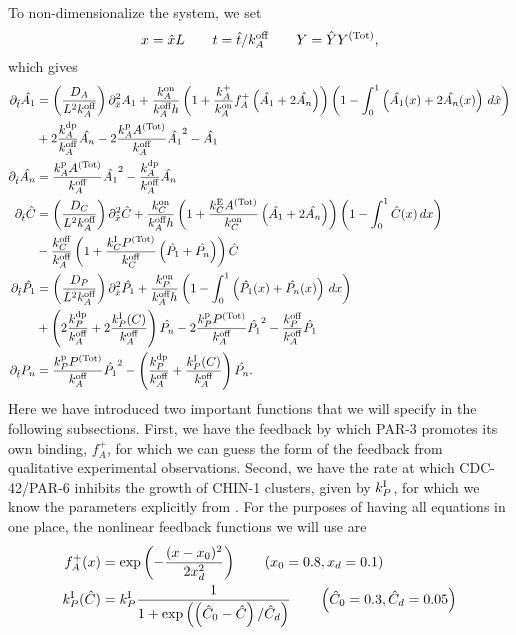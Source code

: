 \documentclass[11pt]{article}
\newcommand{\6}[1]{#1_{\text{6}}}
\newcommand{\3}[1]{#1_{\text{3}}}
\newcommand{\Tot}[1]{#1^\text{(Tot)}}
\newcommand{\A}[1]{#1_A}
\newcommand{\Chin}[1]{#1_P}
\newcommand{\C}[1]{#1_C}
\begin{document}
To non-dimensionalize the system, we set
\begin{equation*}
x = \hat{x} L \qquad t= \hat{t}/\A{\koff} \qquad Y= \hat{Y}\Tot{Y},
\end{equation*}
which gives
\begin{subequations}
\begin{align}
\nonumber
\Dthat \hat{\MA} & = \left(\frac{\A{D}}{L^2 \A{\koff}}\right) \Dxhat^2 \MA + \frac{\A{\kon}}{\A{\koff} h }\left(1+\frac{\A{\kf}}{\A{\kon}}\A{f}^+\left(\hat{\MA}+2\hat{\PA}\right)\right)\left(1 - \int_0^1 \left(\hat{\MA}(x) + 2\hat{\PA}(x)\right) \, d\hat{x} \right) \\  &+ 2\frac{\A{\kdp}}{\A{\koff}}\hat{\PA}-2\frac{\A{\kp} \Tot{A}}{\A{\koff}} \hat{\MA}^2 - \hat{\MA} \\
\Dthat \hat{\PA} & =\frac{\A{\kp} \Tot{A}}{\A{\koff}}\hat{\MA}^2- \frac{\A{\kdp}}{\A{\koff}}\hat{\PA} \\
\Dthat \hat{\CD} &=  \left(\frac{\C{D}}{L^2 \A{\koff}}\right) \Dxhat^2  \hat{\CD} + \frac{\C{\kon}}{\A{\koff} h}\left(1 + \frac{\C{\kE} \Tot{A}}{\C{\kon}} \left(\hat{\MA}+2\hat{\PA}\right)\right)\left(1-\int_0^1  \hat{\CD}(x) \, dx\right) \\  \nonumber
&-  \frac{\C{\koff}}{\A{\koff}}\left(1+\frac{\C{\kI}\Tot{P}}{\C{\koff}} \left(\hat{\MChin}+\hat{\PChin} \right) \right) \hat{\CD}  \\
\Dthat \hat{\MChin} & =   \left(\frac{\Chin{D}}{L^2 \A{\koff}}\right) \Dxhat^2  \hat{\MChin} + \frac{\Chin{\kon}}{\A{\koff}h}\left(1-\int_0^1 \left(\hat{\MChin}(x)+\hat{\PChin}(x)\right)\, dx\right) \\
\nonumber
&+ \left(2\frac{\Chin{\kdp}}{\A{\koff}}+2\frac{\Chin{\kI}(\CD)}{\A{\koff}}\right) \hat{\PChin}  -2\frac{\Chin{\kp} \Tot{P}}{\A{\koff}} \hat{\MChin}^2 - \frac{\Chin{\koff}}{\A{\koff}}\hat{\MChin} \\ 
\Dthat \PChin & =\frac{\Chin{\kp} \Tot{P}}{\A{\koff}} \hat{\MChin}^2 - \left(\frac{\Chin{\kdp}}{\A{\koff}}+\frac{\Chin{\kI}(\CD)}{\A{\koff}}\right) \hat{\PChin}.
\end{align}
\end{subequations}
Here we have introduced two important functions that we will specify in the following subsections. First, we have the feedback by which PAR-3 promotes its own binding, $\A{f}^+$, for which we can guess the form of the feedback from qualitative experimental observations. Second, we have the rate at which CDC-42/PAR-6 inhibits the growth of CHIN-1 clusters, given by $\Chin{\kI}$, for which we know the parameters explicitly from \cite{sailer2015dynamic}. For the purposes of having all equations in one place, the nonlinear feedback functions we will use are
\begin{subequations}
\begin{align}
\A{f}^+(x) &= \exp{\left(-\frac{(x-x_0)^2}{2x_d^2}\right)} \qquad \left(x_0=0.8, x_d=0.1\right)\\
\Chin{\kI}(\hat{\CD}) &=\Chin{\kI}\frac{1}{1+\exp\left(\left(\hat{\CD}_0-\hat{\CD}\right)/\hat{\CD}_d\right)} \qquad \left(\hat{\CD}_0=0.3, \hat{\CD}_d=0.05\right)
\end{align}
\end{subequations}
\fi
\end{document}
